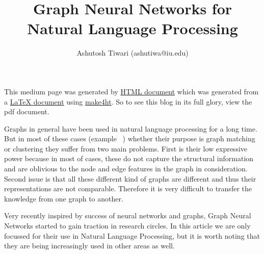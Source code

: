 \documentclass{article}
\title{\textbf{Graph Neural Networks for Natural Language Processing}}
\author{Ashutosh Tiwari (ashutiwa@iu.edu)}
\begin{document}
\maketitle

This medium page was generated by \href{https://thunderock.github.io/blogs/introduction.html}{HTML document} which was generated from a \href{https://thunderock.github.io/blog_pdfs/introduction.pdf}{LaTeX document} using \href{https://github.com/michal-h20/make4ht}{make4ht}. So to see this blog in its full glory, view the pdf document.


Graphs in general have been used in natural language processing for a long time. But in most of these cases (example ~\cite{erkan-2006-language}) whether their purpose is graph matching or clustering they suffer from two main problems. First is their low expressive power because in most of cases, these do not capture the structural information and are oblivious to the node and edge features in the graph in consideration. Second issue is that all these different kind of graphs are different and thus their representations are not comparable. Therefore it is very difficult to transfer the knowledge from one graph to another.


Very recently inspired by success of neural networks and graphs, Graph Neural Networks started to gain traction in research circles. In this article we are only focussed for their use in Natural Language Processing, but it is worth noting that they are being increasingly used in other areas as well. 
\end{document}
